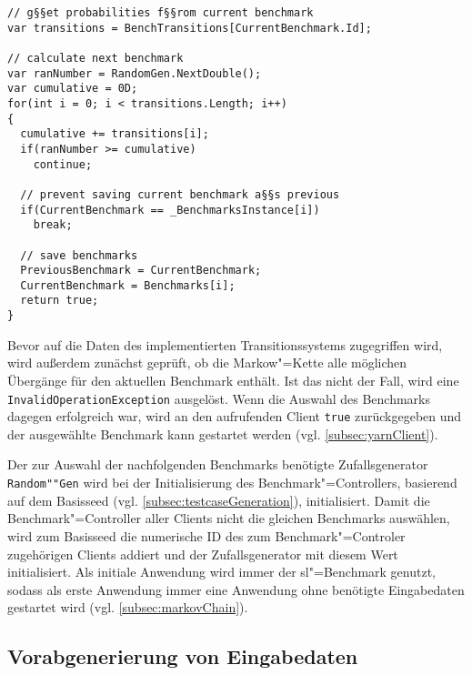 \begin{lstlisting}[label=lst:benchmarkChanging,style=cs,
caption={[Auswahl des nachfolgenden Benchmarks]
    Auswahl des nachfolgenden Benchmarks (gekürzt).
    Dies stellt einen Ausschnitt der Methode \texttt{ChangeBenchmark()} dar, welche vom Client zur Bestimmung des nachfolgenden Benchmarks aufgerufen wird (vgl. \cref{subsec:yarnClient}).}]
// g§§et probabilities f§§rom current benchmark
var transitions = BenchTransitions[CurrentBenchmark.Id];

// calculate next benchmark
var ranNumber = RandomGen.NextDouble();
var cumulative = 0D;
for(int i = 0; i < transitions.Length; i++)
{
  cumulative += transitions[i];
  if(ranNumber >= cumulative)
    continue;
  
  // prevent saving current benchmark a§§s previous
  if(CurrentBenchmark == _BenchmarksInstance[i])
    break;
  
  // save benchmarks
  PreviousBenchmark = CurrentBenchmark;
  CurrentBenchmark = Benchmarks[i];
  return true;
}
\end{lstlisting}

Bevor auf die Daten des implementierten Transitionssystems zugegriffen wird, wird außerdem zunächst geprüft, ob die Markow"=Kette alle möglichen Übergänge für den aktuellen Benchmark enthält.
Ist das nicht der Fall, wird eine \texttt{InvalidOperationException} ausgelöst.
Wenn die Auswahl des Benchmarks dagegen erfolgreich war, wird an den aufrufenden Client \texttt{true} zurückgegeben und der ausgewählte Benchmark kann gestartet werden (vgl. \cref{subsec:yarnClient}).

Der zur Auswahl der nachfolgenden Benchmarks benötigte Zufallsgenerator \texttt{Random""Gen} wird bei der Initialisierung des Benchmark"=Controllers, basierend auf dem Basisseed (vgl. \cref{subsec:testcaseGeneration}), initialisiert.
Damit die Benchmark"=Controller aller Clients nicht die gleichen Benchmarks auswählen, wird zum Basisseed die numerische ID des zum Benchmark"=Controler zugehörigen Clients addiert und der Zufallsgenerator mit diesem Wert initialisiert.
Als initiale Anwendung wird immer der \acrlong{sl}"=Benchmark genutzt, sodass als erste Anwendung immer eine Anwendung ohne benötigte Eingabedaten gestartet wird (vgl. \cref{subsec:markovChain}).

\subsection{Vorabgenerierung von Eingabedaten}
\label{subsec:precreateInputData}

